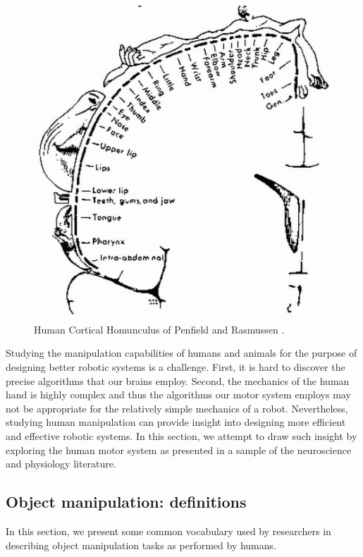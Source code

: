 \begin{figure}[hbt]
	\centering
	\includegraphics[width=\linewidth]{images/sensory_homunculus_penfield}
	\caption{Human Cortical Homunculus of Penfield and Rasmussen \cite{penfield1950cerebral}.}
	\label{fig:sensory_homunculus_penfield}
\end{figure}

Studying the manipulation capabilities of humans and animals for the purpose of designing better robotic systems is a challenge.
First, it is hard to discover the precise algorithms that our brains employ.
Second, the mechanics of the human hand is highly complex and thus the algorithms our motor system employs may not be appropriate for the relatively simple mechanics of a robot.
Nevertheless, studying human manipulation can provide insight into designing more efficient and effective robotic systems.
In this section, we attempt to draw such insight by exploring the human motor system as presented in a sample of the neuroscience and physiology literature.

\subsection{Object manipulation: definitions}

In this section, we present some common vocabulary used by researchers in describing object manipulation tasks as performed by humans.

